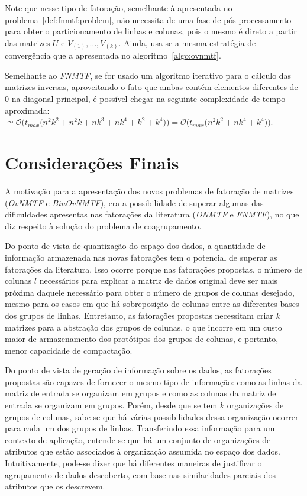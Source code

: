 \documentclass[
    12pt,                %
    oneside,            %
    a4paper,            %
    english,            %
    brazil                %
    ]{abntex2ppgsi}
\begin{document}
Note que nesse tipo de fatoração, semelhante à apresentada no problema~\ref{def:fnmtf:problem}, não necessita de uma fase de pós-processamento para obter o particionamento de linhas e colunas, pois o mesmo é direto a partir das matrizes $U$ e $V_{(1)}, \dots, V_{(k)}$.
Ainda, usa-se a mesma estratégia de convergência que a apresentada no algoritmo~\ref{algo:ovnmtf}.

Semelhante ao \textit{FNMTF}, se for usado um algoritmo iterativo para o cálculo das matrizes inversas, aproveitando o fato que ambas contém elementos diferentes de $0$ na diagonal principal, é possível chegar na seguinte complexidade de tempo aproximada: $\simeq \mathcal{O}\Big( t_{max} \big( n^2k^2 + n^2k + nk^3 + nk^4 + k^2 + k^4 \big) \Big) = \mathcal{O}\Big( t_{max} \big( n^2k^2 + nk^4 + k^4 \big) \Big)$.

\section{Considerações Finais}

A motivação para a apresentação dos novos problemas de fatoração de matrizes (\textit{OvNMTF} e \textit{BinOvNMTF}), era a possibilidade de superar algumas das dificuldades apresentas nas fatorações da literatura (\textit{ONMTF} e \textit{FNMTF}), no que diz respeito à solução do problema de coagrupamento.

Do ponto de vista de quantização do espaço dos dados, a quantidade de informação armazenada nas novas fatorações tem o potencial de superar as fatorações da literatura.
Isso ocorre porque nas fatorações propostas, o número de colunas $l$ necessários para explicar a matriz de dados original deve ser mais próxima daquele necessário para obter o número de grupos de colunas desejado, mesmo para os casos em que há sobreposição de colunas entre as diferentes bases dos grupos de linhas.
Entretanto, as fatorações propostas necessitam criar $k$ matrizes para a abstração dos grupos de colunas, o que incorre em um custo maior de armazenamento dos protótipos dos grupos de colunas, e portanto, menor capacidade de compactação.

Do ponto de vista de geração de informação sobre os dados, as fatorações propostas são capazes de fornecer o mesmo tipo de informação: como as linhas da matriz de entrada se organizam em grupos e como as colunas da matriz de entrada se organizam em grupos.
Porém, desde que se tem $k$ organizações de grupos de colunas, sabe-se que há várias possibilidades dessa organização ocorrer para cada um dos grupos de linhas.
Transferindo essa informação para um contexto de aplicação, entende-se que há um conjunto de organizações de atributos que estão associados à organização assumida no espaço dos dados.
Intuitivamente, pode-se dizer que há diferentes maneiras de justificar o agrupamento de dados descoberto, com base nas similaridades parciais dos atributos que os descrevem.
\end{document}
